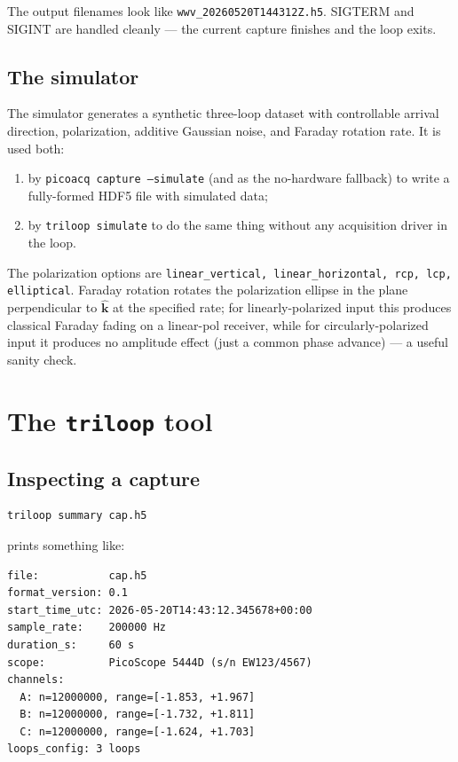 \documentclass[11pt]{article}
\begin{document}
The output filenames look like
\texttt{wwv\_20260520T144312Z.h5}.  SIGTERM and SIGINT are handled
cleanly --- the current capture finishes and the loop exits.

\subsection{The simulator}
\label{sec:simulator}

The simulator generates a synthetic three-loop dataset with controllable
arrival direction, polarization, additive Gaussian noise, and Faraday
rotation rate.  It is used both:
\begin{enumerate}\itemsep=2pt
\item by \texttt{picoacq capture --simulate} (and as the no-hardware
      fallback) to write a fully-formed HDF5 file with simulated data;
\item by \texttt{triloop simulate} to do the same thing without any
      acquisition driver in the loop.
\end{enumerate}

The polarization options are
\texttt{linear\_vertical, linear\_horizontal, rcp, lcp, elliptical}.
Faraday rotation rotates the polarization ellipse in the plane
perpendicular to $\hat{\mathbf k}$ at the specified rate; for
linearly-polarized input this produces classical Faraday fading on a
linear-pol receiver, while for circularly-polarized input it produces
no amplitude effect (just a common phase advance) --- a useful sanity
check.

\section{The \texttt{triloop} tool}

\subsection{Inspecting a capture}

\begin{lstlisting}[style=shell]
triloop summary cap.h5
\end{lstlisting}

prints something like:

\begin{lstlisting}[style=shell]
file:           cap.h5
format_version: 0.1
start_time_utc: 2026-05-20T14:43:12.345678+00:00
sample_rate:    200000 Hz
duration_s:     60 s
scope:          PicoScope 5444D (s/n EW123/4567)
channels:
  A: n=12000000, range=[-1.853, +1.967]
  B: n=12000000, range=[-1.732, +1.811]
  C: n=12000000, range=[-1.624, +1.703]
loops_config: 3 loops
\end{lstlisting}
\end{document}
